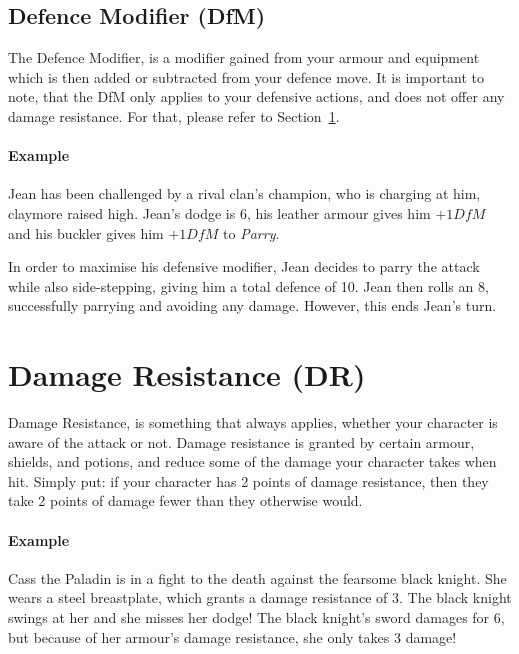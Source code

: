 \subsection{Defence Modifier (DfM)}
The Defence Modifier, is a modifier gained from your armour and equipment which is then added or subtracted from your defence move.
It is important to note, that the DfM only applies to your defensive actions, and does not offer any damage resistance. 
For that, please refer to Section~\ref{sec:damage-resistance}.

\paragraph{Example} Jean has been challenged by a rival clan's champion, who is charging at him, claymore raised high.
Jean's dodge is 6, his leather armour gives him $+1 \mathit{DfM}$ and his buckler gives him $+1 \mathit{DfM}$ to \textit{Parry}.

In order to maximise his defensive modifier, Jean decides to parry the attack while also side-stepping, giving him a total defence of 10.
Jean then rolls an 8, successfully parrying and avoiding any damage.
However, this ends Jean's turn.

\section{Damage Resistance (DR)}\label{sec:damage-resistance}
Damage Resistance, is something that always applies, whether your character is aware of the attack or not.
Damage resistance is granted by certain armour, shields, and potions, and reduce some of the damage your character takes when hit.
Simply put: if your character has 2 points of damage resistance, then they take 2 points of damage fewer than they otherwise would.

\paragraph{Example} Cass the Paladin is in a fight to the death against the fearsome black knight.
She wears a steel breastplate, which grants a damage resistance of 3.
The black knight swings at her and she misses her dodge!
The black knight's sword damages for 6, but because of her armour's damage resistance, she only takes 3 damage!
